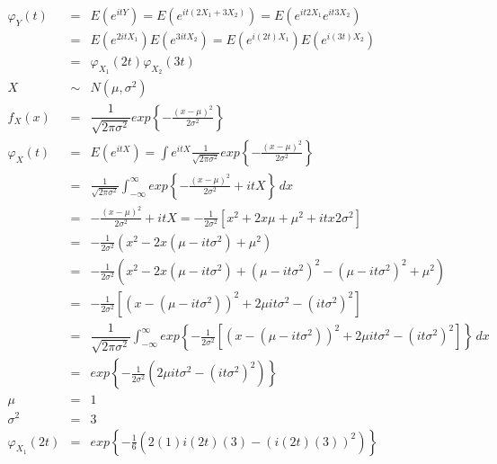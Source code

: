 \begin{enumerate}
 \begin{eqnarray*}
 \varphi_{Y} \left(t \right) &=& E \left(e^{itY} \right) = E \left( e^{it \left(2X_{1}+ 3X_{2} \right) } \right) = E \left( e^{it2X_{1}}e^{it3X_2{}} \right)\\
 &=&  E \left( e^{2itX_{1}} \right) E\left(e^{3itX_2} \right)=  E \left( e^{i \left( 2t \right) X_{1}} \right) E\left(e^{i \left( 3t \right) X_2} \right)\\
 &=& \varphi_{X_{1}} \left(2t \right)\varphi_{X_{2}} \left(3t \right) \\
 X &\sim & N \left(\mu, \sigma^{2} \right)\\
 f_{X} \left(x \right) &=& \dfrac{1}{\sqrt{2\pi\sigma^2}}exp \left\{ - \frac{\left( x-\mu \right)^2 }{2\sigma^{2}} \right\}\\
 \varphi_{X} \left(t \right) &=& E \left( e^{itX} \right) = \int e^{itX} \frac{1}{\sqrt{2\pi\sigma^2}}exp \left\{ - \frac{\left( x-\mu \right)^2 }{2\sigma^{2}} \right\}\\
 &=& \frac{1}{\sqrt{2\pi\sigma^2}} \int_{-\infty}^{\infty} exp \left\{ - \frac{\left( x-\mu \right)^2 }{2\sigma^{2}}+ itX \right\}\, dx\\
 &=& - \frac{\left( x-\mu \right)^2 }{2\sigma^{2}}+ itX =- \frac{1}{2\sigma^2} \left[ x^2+2x\mu+ \mu^2+ itx2\sigma^2 \right]\\
 &=& - \frac{1}{2\sigma^2}\left( x^2 - 2x \left( \mu - it\sigma^2 \right)+ \mu^2 \right)\\
 &=& - \frac{1}{2\sigma^2}\left( x^2 - 2x \left(\mu - it \sigma^2 \right) + \left(\mu - it\sigma^2 \right)^2 - \left(\mu - it\sigma^2 \right)^2+ \mu^2 \right)\\
 &=&  - \frac{1}{2\sigma^2} \left[ \left( x- \left(\mu - it\sigma^2 \right) \right)^2 + 2\mu it\sigma^2- \left(it\sigma ^2 \right)^2 \right]\\
 &=& \dfrac{1}{\sqrt{2\pi\sigma^2}} \int_{-\infty}^{\infty} exp \left\{ - \frac{1}{2\sigma^2} \left[ \left( x- \left(\mu - it\sigma^2 \right) \right)^2 + 2\mu it\sigma^2- \left(it\sigma ^2 \right)^2 \right] \right\} \, dx\\
 &=& exp \left\{ - \frac{1}{2\sigma^2} \left( 2\mu it \sigma^2 - \left( it\sigma^2 \right)^2 \right)\right\}\\
 \mu &=& 1\\
 \sigma^2 &=& 3\\
 \varphi_{X_{1}} \left(2t \right) &=& exp \left\{ - \frac{1}{6} \left( 2 \left(1 \right)i \left(2t \right) \left(3 \right)- \left(i \left(2t \right)\left(3 \right) \right)^{2} \right)\right\}\\

\end{eqnarray*}
\end{enumerate}
